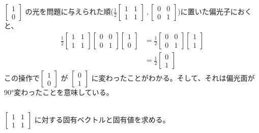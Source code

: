 \documentclass{jsarticle}
\begin{document}
\subsection{}
$\begin{bmatrix}
1  \\
0
\end{bmatrix}$
の光を問題に与えられた順($\frac{1}{2}\begin{bmatrix}
1&1  \\
1 & 1
\end{bmatrix} \  ,   \begin{bmatrix}
0&0  \\
0&1 
\end{bmatrix}$)に置いた偏光子におくと、
\begin{align}
\frac{1}{2}\begin{bmatrix}
1&1  \\
1 & 1
\end{bmatrix}
\begin{bmatrix}
0&0  \\
0&1 
\end{bmatrix}
\begin{bmatrix}
1  \\
0
\end{bmatrix}
&=
\frac{1}{2}
\begin{bmatrix}
0&0  \\
0&1
\end{bmatrix}
\begin{bmatrix}
1  \\
1
\end{bmatrix}  \\
&=
\frac{1}{2}
\begin{bmatrix}
0  \\
1
\end{bmatrix}
\end{align}
この操作で$\begin{bmatrix}
1  \\
0
\end{bmatrix}$
が
$\begin{bmatrix}
0  \\
1
\end{bmatrix}$
に変わったことがわかる。そして、それは偏光面が90°変わったことを意味している。


\subsection{}
$\begin{bmatrix}
1&1 \\
1&1
\end{bmatrix}$
に対する固有ベクトルと固有値を求める。
\end{document}
